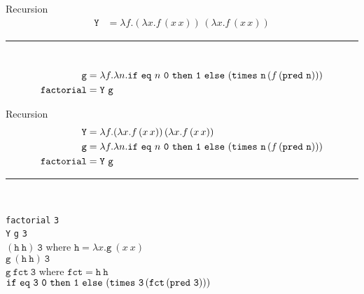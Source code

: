 \documentclass{beamer}
\newcommand{\mkw}[1]{{\bf \mathtt{#1}}}
\newcommand{\sym}[1]{\texttt{#1}}
\newcommand{\msym}[1]{\mathtt{#1}}
\newcommand{\hr}[0]{\rule{10.75cm}{0.4pt}\\}
\begin{document}
\begin{frame}{Recursion}
\begin{align*}
\msym{Y} &= \lambda f.(\lambda x.f\,(x\,x))\,(\lambda x.f\,(x\,x))
\end{align*}
\hr
\begin{align*}
\msym{g} &= \lambda f.\lambda
n.\mkw{if}\ \msym{eq}\ n\ \msym{0}\ \mkw{then}\ \msym{1}\ \mkw{else}\ (\msym{times}\ \msym{n}\,(f\,(\msym{pred}\ \msym{n}))) \\
\msym{factorial} &= \msym{Y}\ \msym{g}
\end{align*}
\end{frame}
\begin{frame}{Recursion}
\begin{align*}
\msym{Y} &= \lambda f.(\lambda x.f\,(x\,x))\,(\lambda x.f\,(x\,x)) \\
\msym{g} &= \lambda f.\lambda
n.\mkw{if}\ \msym{eq}\ n\ \msym{0}\ \mkw{then}\ \msym{1}\ \mkw{else}\ (\msym{times}\ \msym{n}\,(f\,(\msym{pred}\ \msym{n}))) \\
\msym{factorial} &= \msym{Y}\ \msym{g}
\end{align*}
\hr
\begin{tabbing}
\sym{factorial} \sym{3} ~~~~~~~~~~~~~~~~~~~ \= \\
\sym{Y} \sym{g} \sym{3} \> \\
$(\msym{h}\ \msym{h})\ \msym{3}$ \> where $\msym{h}=\lambda x.\msym{g}\ (x\ x)$ \\
$\msym{g}\ (\msym{h}\ \msym{h})\ \msym{3}$ \> \\
$\msym{g}\ \msym{fct}\ \msym{3}$ \> where $\msym{fct}=\msym{h}\ \msym{h}$ \\
$\mkw{if}\ \msym{eq}\ \msym{3}\ \msym{0}\ \mkw{then}\ \msym{1}\ \mkw{else}\ (\msym{times}\ \msym{3}\,(\msym{fct}\,(\msym{pred}\ \msym{3})))$ \>
\end{tabbing}
\end{frame}
\end{document}
